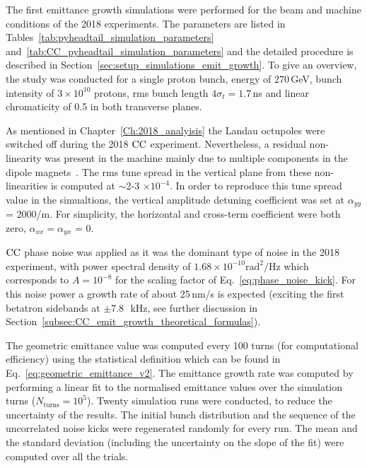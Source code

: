 The first emittance growth simulations were performed for the beam and machine conditions of the 2018 experiments. The parameters are listed in Tables~\ref{tab:pyheadtail_simulation_parameters} and~\ref{tab:CC_pyheadtail_simulation_parameters} and the detailed procedure is described in Section~\ref{sec:setup_simulations_emit_growth}. To give an overview, the study was conducted for a single proton bunch, energy of 270\,GeV, bunch intensity of $3 \times 10^{10}$ protons, rms bunch length $4 \sigma_t = 1.7$\,ns and linear chromaticity of 0.5 in both transverse planes. 

As mentioned in Chapter~\ref{Ch:2018_analyisis} the Landau octupoles were switched off during the 2018 ${\mathrm{CC}}$ experiment. Nevertheless, a residual non-linearity was present in the machine mainly due to multiple components in the dipole magnets~\cite{Carlà:2664976, Alekou:2640326}. The rms tune spread in the vertical plane from these non-linearities is computed at $\sim$2-3 $\times 10^{-4}$. In order to reproduce this tune spread value in the simualtions, the vertical amplitude detuning coefficient was set at $\alpha_{yy}$ = 2000/m. For simplicity, the horizontal and cross-term coefficient were both zero, $\alpha_{xx}=\alpha_{yx}$ = 0.

${\mathrm{CC}}$ phase noise was applied as it was the dominant type of noise in the 2018 experiment, with power spectral density of $1.68 \times 10^{-10} \mathrm{rad^2/Hz}$ which corresponds to $A=10^{-8}$ for the scaling factor of Eq.~\eqref{eq:phase_noise_kick}. For this noise power a growth rate of about 25\,nm/s is expected (exciting the first betatron sidebands at $\pm$7.8~\,kHz, see further discussion in Section~\ref{subsec:CC_emit_growth_theoretical_formulas}). 

The geometric emittance value was computed every 100 turns (for computational efficiency) using the statistical definition which can be found in Eq.~\eqref{eq:geometric_emittance_v2}. The emittance growth rate was computed by performing a linear fit to the normalised 
emittance values over the simulation turns ($N_\mathrm{turns}=10^5$). Twenty simulation runs were conducted, to reduce the uncertainty of the results. The initial bunch distribution and the sequence of the uncorrelated noise kicks were regenerated randomly for every run. The mean and the standard deviation (including the uncertainty on the slope of the fit) were computed over all the trials.  

